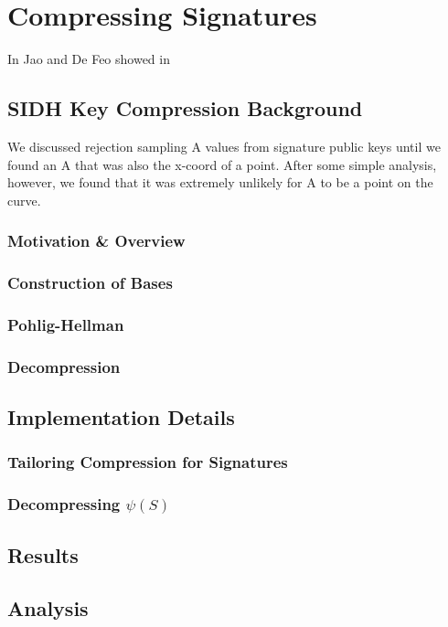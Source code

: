 \chapter{Compressing Signatures}

In Jao and De Feo showed in 

\section{SIDH Key Compression Background}

We discussed rejection sampling A values from signature public keys until we found an A that was also the x-coord of a point. After some simple analysis, however, we found that it was extremely unlikely for A to be a point on the curve.\\

\subsection{Motivation \& Overview}


\subsection{Construction of Bases}

\subsection{Pohlig-Hellman}

\subsection{Decompression}

\section{Implementation Details}

\subsection{Tailoring Compression for Signatures}

\subsection{Decompressing $\psi(S)$}

\section{Results}

\section{Analysis}

